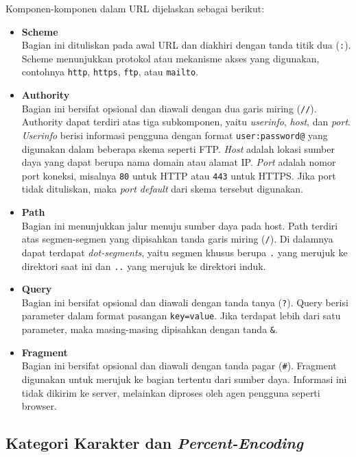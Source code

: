 Komponen-komponen dalam URL dijelaskan sebagai berikut:
\begin{itemize}
  \item \textbf{Scheme}\\
  Bagian ini dituliskan pada awal URL dan diakhiri dengan tanda titik dua (\texttt{:}). Scheme menunjukkan protokol atau mekanisme akses yang digunakan, contohnya \texttt{http}, \texttt{https}, \texttt{ftp}, atau \texttt{mailto}.
  
  \item \textbf{Authority}\\
  Bagian ini bersifat opsional dan diawali dengan dua garis miring (\texttt{//}). Authority dapat terdiri atas tiga subkomponen, yaitu \textit{userinfo}, \textit{host}, dan \textit{port}. \textit{Userinfo} berisi informasi pengguna dengan format \texttt{user:password@} yang digunakan dalam beberapa skema seperti FTP. \textit{Host} adalah lokasi sumber daya yang dapat berupa nama domain atau alamat IP. \textit{Port} adalah nomor port koneksi, misalnya \texttt{80} untuk HTTP atau \texttt{443} untuk HTTPS. Jika port tidak dituliskan, maka \textit{port default} dari skema tersebut digunakan.
  
  \item \textbf{Path}\\
  Bagian ini menunjukkan jalur menuju sumber daya pada host. Path terdiri atas segmen-segmen yang dipisahkan tanda garis miring (\texttt{/}). Di dalamnya dapat terdapat \textit{dot-segments}, yaitu segmen khusus berupa \texttt{.} yang merujuk ke direktori saat ini dan \texttt{..} yang merujuk ke direktori induk.
  
  \item \textbf{Query}\\
  Bagian ini bersifat opsional dan diawali dengan tanda tanya (\texttt{?}). Query berisi parameter dalam format pasangan \texttt{key=value}. Jika terdapat lebih dari satu parameter, maka masing-masing dipisahkan dengan tanda \texttt{\&}.
  
  \item \textbf{Fragment}\\
  Bagian ini bersifat opsional dan diawali dengan tanda pagar (\texttt{\#}). Fragment digunakan untuk merujuk ke bagian tertentu dari sumber daya. Informasi ini tidak dikirim ke server, melainkan diproses oleh agen pengguna seperti browser.
\end{itemize}

\subsection{Kategori Karakter dan \textit{Percent-Encoding}}
\label{subsec:0202-karakter-percent-encoding}

